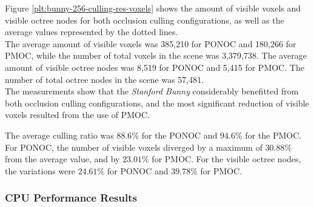 \noindent
Figure \ref{plt:bunny-256-culling-res-voxels} shows the amount of visible voxels and visible 
octree nodes for both occlusion culling configurations, as well as the average values represented 
by the dotted lines. \\

\noindent
The average amount of visible voxels was 385,210 for \ac{PONOC} and 180,266 for \ac{PMOC},
while the number of total voxels in the scene was 3,379,738. The average amount of visible 
octree nodes was 8,519 for \ac{PONOC} and 5,415 for \ac{PMOC}. The number of total octree 
nodes in the scene was 57,481. \\

\noindent
The measurements show that the \emph{Stanford Bunny} considerably benefitted from both occlusion 
culling configurations, and the most significant reduction of visible voxels resulted from the use 
of \ac{PMOC}. \\
\enlargethispage{\baselineskip}
\enlargethispage{\baselineskip}

\noindent
The average culling ratio was $88.6\%$ for the \ac{PONOC} and $94.6\%$ for the 
\ac{PMOC}. For \ac{PONOC}, the number of visible voxels diverged by a maximum of $30.88\%$ from 
the average value, and by $23.01\%$ for \ac{PMOC}. For the visible octree nodes, the variations were 
$24.61\%$ for \ac{PONOC} and $39.78\%$ for \ac{PMOC}.

\subsubsection*{CPU Performance Results} \label{subsubsec-cpu-performance-results-bunny}

